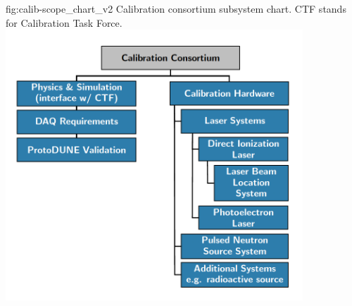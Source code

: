 \begin{dunefigure}{fig:calib-scope_chart_v2}
{Calibration consortium subsystem chart. CTF stands for Calibration Task Force.}
\includegraphics[height=4.0in]{graphics/calib-scope_chart_v3.png}
\end{dunefigure}

